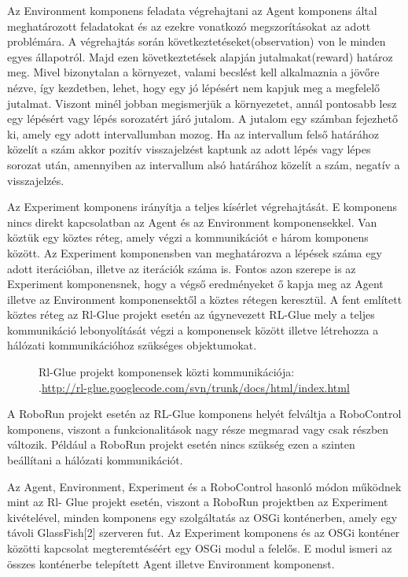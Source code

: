 	Az Environment komponens feladata végrehajtani az Agent komponens által meghatározott feladatokat és az ezekre vonatkozó megszorításokat az adott problémára. A végrehajtás során következtetéseket(observation) von le minden egyes állapotról. Majd ezen következtetések alapján jutalmakat(reward) határoz meg. Mivel bizonytalan a környezet,    valami becslést kell alkalmaznia a jövőre nézve, így kezdetben, lehet, hogy egy jó lépésért nem kapjuk meg a megfelelő jutalmat. Viszont minél jobban megismerjük a környezetet, annál pontosabb lesz egy lépésért vagy lépés sorozatért járó jutalom. A jutalom egy számban fejezhető ki, amely egy adott intervallumban mozog. Ha az intervallum felső határához közelít a szám akkor pozitív visszajelzést kaptunk az adott lépés vagy lépes sorozat után, amennyiben az intervallum alsó határához közelít a szám, negatív a visszajelzés.
	
	Az Experiment komponens irányítja a teljes kísérlet végrehajtását. E komponens nincs direkt kapcsolatban az Agent és az Environment komponensekkel. Van köztük egy köztes réteg, amely végzi a kommunikációt e három komponens között.  Az Experiment komponensben van meghatározva a lépések száma egy adott iterációban, illetve az iterációk száma is. Fontos azon szerepe is az Experiment komponensnek, hogy a végső eredményeket ő kapja meg az Agent illetve az Environment komponensektől a köztes rétegen keresztül.
A fent említett köztes réteg az Rl-Glue projekt esetén az úgynevezett RL-Glue mely a teljes kommunikáció lebonyolítását végzi a komponensek között illetve létrehozza a hálózati kommunikációhoz szükséges objektumokat.

\begin{figure}[t]
  \centering
  \caption[Példa képek beszúrására]%
  {Rl-Glue projekt komponensek közti kommunikációja:\\
  {\white .}\hfill\url{http://rl-glue.googlecode.com/svn/trunk/docs/html/index.html}}
  \label{fig:ALAP:sm1}
\end{figure}

A RoboRun projekt esetén az RL-Glue komponens helyét felváltja a RoboControl komponens, viszont a funkcionalitások nagy része megmarad vagy csak részben változik. Például a RoboRun projekt esetén nincs szükség ezen a szinten beállítani a hálózati kommunikációt.

	Az Agent, Environment, Experiment és a RoboControl hasonló módon működnek mint az Rl- Glue projekt esetén, viszont a RoboRun projektben az Experiment kivételével, minden komponens  egy szolgáltatás az OSGi konténerben, amely egy távoli GlassFish[2] szerveren fut. Az Experiment komponens és az OSGi konténer közötti kapcsolat megteremtéséért egy OSGi modul a felelős. E modul ismeri az összes konténerbe telepített Agent illetve Environment komponenst.
	

